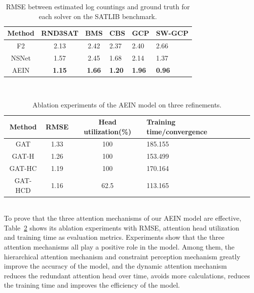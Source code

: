 \begin{table}[htbp] 
  \centering  
  \caption{RMSE between estimated log countings and ground truth for each solver on the SATLIB benchmark.}  
  \begin{tabular}{ccclll}  
    \toprule
    Method& RND3SAT& BMS & CBS& GCP&SW-GCP\\  
    \midrule
    F2& 2.13& 2.42& 2.37& 2.40&2.66\\  
    NSNet& 1.57& 2.45& 1.68& 2.14&1.37\\  
    AEIN& \textbf{1.15}& \textbf{1.66}& \textbf{1.20}& \textbf{1.96}&\textbf{0.96}\\  
    \bottomrule
  \end{tabular}
  \label{tab2}  
\end{table}\\

\begin{table}[htbp] 
  \centering  
  \caption{Ablation experiments of the AEIN model on three refinements.}  
  \begin{tabular}{ccclll}  
    \toprule
    Method& RMSE& Head utilization(\%)& Training time/convergence\\ 
    \midrule
    GAT& 1.33& 100& 185.155\\  
    GAT-H& 1.26& 100& 153.499\\  
    GAT-HC& 1.19& 100& 170.164\\
    \centering  
    GAT-HCD& 1.16& 62.5& 113.165\\  
    \bottomrule
  \end{tabular}
  \label{tab3}  
\end{table}\\

To prove that the three attention mechanisms of our AEIN model are effective, Table~\ref{tab3} shows its ablation experiments with 
RMSE, attention head utilization and training time as evaluation metrics. Experiments show that the three attention mechanisms all 
play a positive role in the model. Among them, the hierarchical attention mechanism and constraint perception mechanism greatly 
improve the accuracy of the model, and the dynamic attention mechanism reduces the redundant attention head over time, avoids more 
calculations, reduces the training time and improves the efficiency of the model.
